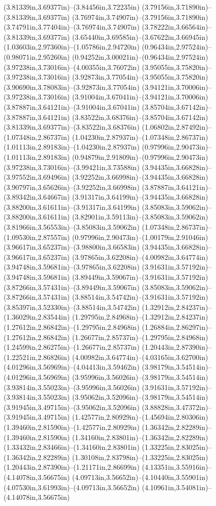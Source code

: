 (3.81339in,3.69377in)--(3.84456in,3.72235in) (3.79156in,3.71890in)--(3.81339in,3.69377in) (3.76974in,3.74907in)--(3.79156in,3.71890in) (3.74791in,3.77404in)--(3.76974in,3.74907in) (3.78222in,3.66564in)--(3.81339in,3.69377in) (3.65440in,3.69585in)--(3.67622in,3.66945in) (1.03603in,2.97360in)--(1.05786in,2.94720in) (0.96434in,2.97524in)--(0.98071in,2.95260in) (0.94252in,3.00021in)--(0.96434in,2.97524in) (3.97238in,3.73016in)--(4.00355in,3.76072in) (3.95055in,3.75820in)--(3.97238in,3.73016in) (3.92873in,3.77054in)--(3.95055in,3.75820in) (3.90690in,3.78083in)--(3.92873in,3.77054in) (3.94121in,3.70006in)--(3.97238in,3.73016in) (3.91004in,3.67041in)--(3.94121in,3.70006in) (3.87887in,3.64121in)--(3.91004in,3.67041in) (3.85704in,3.67142in)--(3.87887in,3.64121in) (3.83522in,3.68376in)--(3.85704in,3.67142in) (3.81339in,3.69377in)--(3.83522in,3.68376in) (1.06802in,2.87492in)--(1.07348in,2.86737in) (1.04230in,2.87937in)--(1.07348in,2.86737in) (1.01113in,2.89183in)--(1.04230in,2.87937in) (0.97996in,2.90473in)--(1.01113in,2.89183in) (0.94879in,2.91809in)--(0.97996in,2.90473in) (3.97238in,3.73016in)--(3.99421in,3.73588in) (3.94435in,3.66828in)--(3.97552in,3.69496in) (3.92252in,3.66998in)--(3.94435in,3.66828in) (3.90797in,3.65626in)--(3.92252in,3.66998in) (3.87887in,3.64121in)--(3.89342in,3.64667in) (3.91317in,3.64199in)--(3.94435in,3.66828in) (3.88200in,3.61611in)--(3.91317in,3.64199in) (3.85083in,3.59062in)--(3.88200in,3.61611in) (3.82901in,3.59113in)--(3.85083in,3.59062in) (3.81966in,3.56553in)--(3.85083in,3.59062in) (1.07348in,2.86737in)--(1.09530in,2.87557in) (0.97996in,2.90473in)--(1.00179in,2.91046in) (3.96617in,3.65237in)--(3.98800in,3.66583in) (3.94435in,3.66828in)--(3.96617in,3.65237in) (3.97865in,3.62208in)--(4.00982in,3.64774in) (3.94748in,3.59681in)--(3.97865in,3.62208in) (3.91631in,3.57192in)--(3.94748in,3.59681in) (3.89449in,3.59067in)--(3.91631in,3.57192in) (3.87266in,3.57431in)--(3.89449in,3.59067in) (3.85083in,3.59062in)--(3.87266in,3.57431in) (3.88514in,3.54742in)--(3.91631in,3.57192in) (3.85397in,3.52330in)--(3.88514in,3.54742in) (1.32912in,2.84237in)--(1.36029in,2.83544in) (1.29795in,2.84968in)--(1.32912in,2.84237in) (1.27612in,2.86842in)--(1.29795in,2.84968in) (1.26884in,2.86297in)--(1.27612in,2.86842in) (1.26677in,2.85737in)--(1.29795in,2.84968in) (1.24599in,2.86275in)--(1.26677in,2.85737in) (1.20443in,2.87390in)--(1.22521in,2.86826in) (4.00982in,3.64774in)--(4.03165in,3.62700in) (4.01296in,3.56969in)--(4.04413in,3.59462in) (3.98179in,3.54514in)--(4.01296in,3.56969in) (3.95996in,3.56026in)--(3.98179in,3.54514in) (3.93814in,3.55023in)--(3.95996in,3.56026in) (3.91631in,3.57192in)--(3.93814in,3.55023in) (3.95062in,3.52096in)--(3.98179in,3.54514in) (3.91945in,3.49715in)--(3.95062in,3.52096in) (3.88828in,3.47372in)--(3.91945in,3.49715in) (1.42577in,2.80929in)--(1.45694in,2.80306in) (1.39460in,2.81590in)--(1.42577in,2.80929in) (1.36342in,2.82289in)--(1.39460in,2.81590in) (1.34160in,2.83801in)--(1.36342in,2.82289in) (1.33432in,2.83466in)--(1.34160in,2.83801in) (1.33225in,2.83025in)--(1.36342in,2.82289in) (1.30108in,2.83798in)--(1.33225in,2.83025in) (1.20443in,2.87390in)--(1.21171in,2.86699in) (4.13351in,3.55916in)--(4.14078in,3.56675in) (4.09713in,3.56652in)--(4.10440in,3.55901in) (4.07530in,3.61993in)--(4.09713in,3.56652in) (4.10961in,3.54081in)--(4.14078in,3.56675in) 
